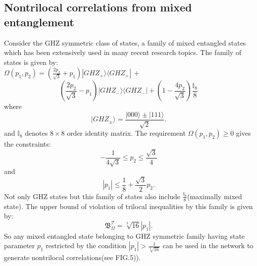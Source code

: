 \documentclass[pra,10pt,twocolumn,superscriptaddress,floatfix,showpacs]{revtex4-1}
\begin{document}
\subsection{Nontrilocal correlations from mixed entanglement}
Consider the GHZ symmetric class of states, a family of mixed entangled states which has been extensively used in many recent research  topics\cite{gs1,gs2,gs3,gs4}. The family of states is given by:\\
$\Omega(p_1, p_2) = (\frac{2p_2}{\sqrt{3}}+ p_1)|GHZ_{+}\rangle\langle GHZ_{+}| \,+$
\begin{equation}\label{pst9iii}
(\frac{2p_2}{\sqrt{3}}- p_1)|GHZ_{-}\rangle\langle GHZ_{-}| + (1- \frac{4p_2}{\sqrt{3}})\frac{\mathbb{I}_8}{8}
\end{equation}
where
\begin{equation}\label{ghz}
    |GHZ_{\pm}\rangle = \frac{|000\rangle \pm |111\rangle}{\sqrt{2}}.
\end{equation}
and $\mathbb{I}_{8}$ denotes $8\times 8$ order identity matrix. The requirement $\Omega(p_1, p_2)\geq 0$ gives the constraints:
\begin{equation}\label{g1}
    -\frac{1}{4\sqrt{3}}\leq p_2 \leq \frac{\sqrt{3}}{4}
\end{equation}
 and
\begin{equation}\label{pst9iv}
|p_1| \leq \frac{1}{8}+\frac{\sqrt{3}}{2} p_2.
\end{equation}
Not only GHZ states but this family of states also include $\frac{\mathbb{I}_8}{8}$(maximally mixed state). The upper bound of violation of trilocal inequalities by this family is given by:
\begin{equation}\label{ghzs1}
    \mathfrak{B}^\mathcal{T}_{\Omega}=\sqrt[3]{16}|p_1|.
\end{equation}
So any mixed entangled state belonging to GHZ symmetric family having state parameter $p_1$ restricted by the condition $|p_1|>\frac{1}{\sqrt[3]{16}}$ can be used in the network to generate nontrilocal correlations(see FIG.5)). \\
\end{document}
